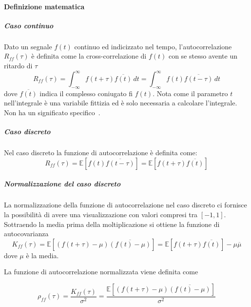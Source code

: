 \paragraph{Definizione matematica} 
\subparagraph*{Caso continuo}
Dato un segnale $f(t)$ continuo ed indicizzato nel tempo, l'autocorrelazione $R_{ff}(\tau)$
è definita come la cross-correlazione di $f(t)$ con se stesso avente un ritardo di $\tau$
\[R_{ff}(\tau) = \int_{-\infty}^{\infty} f(t+\tau) \overline{f(t)}  \,dt =  \int_{-\infty}^{\infty} f(t) \overline{f(t-\tau)}  \,dt \]
dove $\overline{f(t)}$ indica il complesso coniugato fi $f(t)$. 
Nota come il parametro $t$ nell'integrale è una variabile fittizia ed è solo necessaria
a calcolare l'integrale. Non ha un significato specifico~\cite{wiki:autcor_en}.

\subparagraph*{Caso discreto}
Nel caso discreto la funzione di autocorrelazione è definita come:
\[ R_{ff}(\tau) = \mathbb{E} \left[ f(t) \overline{f(t-\tau)} \right] = \mathbb{E} \left[ f(t + \tau) \overline{f(t)} \right] \] 

\subparagraph*{Normalizzazione del caso discreto}
La normalizzazione della funzione di autocorrelazione nel caso discreto ci fornisce la 
possibilità di avere una visualizzazione con valori compresi tra $[-1, 1]$. 
Sottraendo la media prima della moltiplicazione si ottiene la funzione di autocovarianza 
\[ 
K_{ff}(\tau) = 
\mathbb{E} \left[ \left( f(t + \tau) - \mu \right) \overline{ \left( f(t) - \mu \right) } \right] =  
\mathbb{E} \left[ f(t + \tau) \overline{ f(t) } \right] - \mu\overline{\mu} 
\] 
dove $\mu$ è la media.


La funzione di autocorrelazione normalizzata viene definita come 

\[ 
\rho_{ff}(\tau) = \frac{K_{ff}(\tau)}{\sigma^2} = 
\frac{\mathbb{E} \left[ \left( f(t + \tau) - \mu \right) \overline{ \left( f(t) - \mu \right) } \right]}{\sigma^2}
\] 



